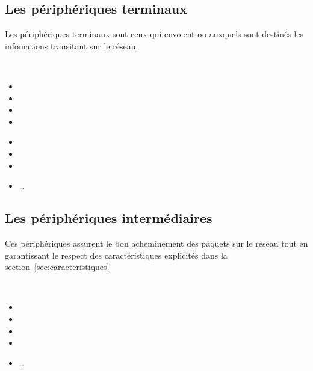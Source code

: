 \documentclass[10pt,fleqn]{article} %
\begin{document}
\subsection{Les périphériques terminaux}
\begin{defi}
  Les périphériques terminaux sont ceux qui envoient ou auxquels sont destinés les infomations transitant sur le réseau.
\end{defi}
\begin{exemple}~\\
  \begin{minipage}[c]{.5\textwidth}
    \begin{itemize}
      \item {}
      \item {}
      \item {}
      \item {}
    \end{itemize}
  \end{minipage}
  \begin{minipage}[c]{.5\textwidth}
    \begin{itemize}
      \item {}
      \item {}
      \item {}
      \item \dots
    \end{itemize}
  \end{minipage}
\end{exemple}
\subsection{Les périphériques intermédiaires}
\begin{defi}
  Ces périphériques assurent le bon acheminement des paquets sur le réseau tout en garantissant le respect des caractéristiques explicités dans la section~\ref{sec:caracteristiques}
\end{defi}
\begin{exemple}~\\
    \begin{itemize}
      \item {}
      \item {}
      \item {}
      \item {}
      \item \dots
    \end{itemize}
\end{exemple}
\end{document}
